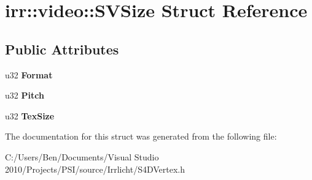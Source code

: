 \hypertarget{structirr_1_1video_1_1_s_v_size}{\section{irr\-:\-:video\-:\-:S\-V\-Size Struct Reference}
\label{structirr_1_1video_1_1_s_v_size}
}
\subsection*{Public Attributes}
\begin{DoxyCompactItemize}
\item 
\hypertarget{structirr_1_1video_1_1_s_v_size_ad19fcf7c1a8710fc3fd894ba4db89e37}{u32 {\bfseries Format}}\label{structirr_1_1video_1_1_s_v_size_ad19fcf7c1a8710fc3fd894ba4db89e37}

\item 
\hypertarget{structirr_1_1video_1_1_s_v_size_add9f91674d7369ad1a6dcd3885bcec16}{u32 {\bfseries Pitch}}\label{structirr_1_1video_1_1_s_v_size_add9f91674d7369ad1a6dcd3885bcec16}

\item 
\hypertarget{structirr_1_1video_1_1_s_v_size_adba2113a0ec2458f558cbd5c117a7ad7}{u32 {\bfseries Tex\-Size}}\label{structirr_1_1video_1_1_s_v_size_adba2113a0ec2458f558cbd5c117a7ad7}

\end{DoxyCompactItemize}


The documentation for this struct was generated from the following file\-:\begin{DoxyCompactItemize}
\item 
C\-:/\-Users/\-Ben/\-Documents/\-Visual Studio 2010/\-Projects/\-P\-S\-I/source/\-Irrlicht/S4\-D\-Vertex.\-h\end{DoxyCompactItemize}
